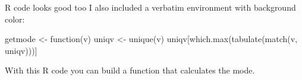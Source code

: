 
\begin{frame}[fragile]{R code looks good too}
	I also included a verbatim environment with background color:
	\begin{cverbatim}
getmode <- function(v) {
	uniqv <- unique(v)
	uniqv[which.max(tabulate(match(v, uniqv)))]
	}
	\end{cverbatim}
	With this R code you can build a function that calculates the mode.
\end{frame}

















